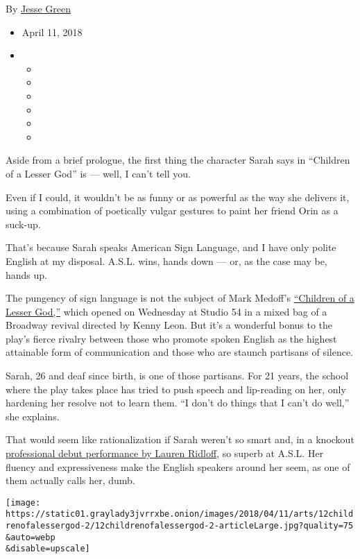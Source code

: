 By \href{http://www.nytimes3xbfgragh.onion/by/jesse-green}{Jesse Green}

\begin{itemize}
\item
  April 11, 2018
\item
  \begin{itemize}
  \item
  \item
  \item
  \item
  \item
  \item
  \end{itemize}
\end{itemize}

Aside from a brief prologue, the first thing the character Sarah says in
``Children of a Lesser God'' is --- well, I can't tell you.

Even if I could, it wouldn't be as funny or as powerful as the way she
delivers it, using a combination of poetically vulgar gestures to paint
her friend Orin as a suck-up.

That's because Sarah speaks American Sign Language, and I have only
polite English at my disposal. A.S.L. wins, hands down --- or, as the
case may be, hands up.

The pungency of sign language is not the subject of Mark Medoff's
\href{http://childrenofalessergodbroadway.com}{``Children of a Lesser
God,''} which opened on Wednesday at Studio 54 in a mixed bag of a
Broadway revival directed by Kenny Leon. But it's a wonderful bonus to
the play's fierce rivalry between those who promote spoken English as
the highest attainable form of communication and those who are staunch
partisans of silence.

Sarah, 26 and deaf since birth, is one of those partisans. For 21 years,
the school where the play takes place has tried to push speech and
lip-reading on her, only hardening her resolve not to learn them. ``I
don't do things that I can't do well,'' she explains.

That would seem like rationalization if Sarah weren't so smart and, in a
knockout
\href{https://www.nytimes3xbfgragh.onion/2018/02/14/t-magazine/lauren-ridloff.html}{professional
debut performance by Lauren Ridloff}, so superb at A.S.L. Her fluency
and expressiveness make the English speakers around her seem, as one of
them actually calls her, dumb.

\texttt{[image: https://static01.graylady3jvrrxbe.onion/images/2018/04/11/arts/12childrenofalessergod-2/12childrenofalessergod-2-articleLarge.jpg?quality=75\\\&auto=webp\\\&disable=upscale]}

